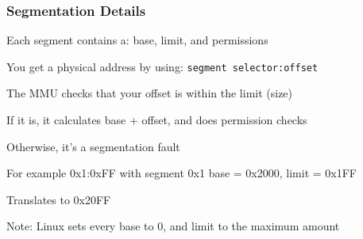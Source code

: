   \begin{frame}
    \frametitle{Segmentation Details}

    Each segment contains a: base, limit, and permissions

    \hspace{2em} You get a physical address by using: \texttt{segment selector:offset}

    \vspace{2em}

    The MMU checks that your offset is within the limit (size)

    \hspace{2em} If it is, it calculates base + offset, and does permission checks

    \hspace{4em} Otherwise, it's a segmentation fault

    \vspace{2em}

    For example 0x1:0xFF with segment 0x1 base = 0x2000, limit = 0x1FF

    \hspace{2em} Translates to 0x20FF

    \vspace{2em}

    Note: Linux sets every base to 0, and limit to the maximum amount
  \end{frame}




